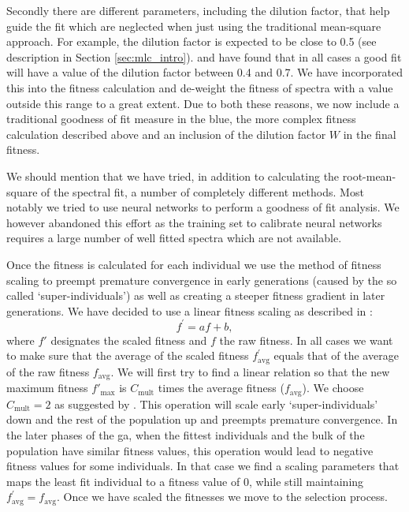 Secondly there are different parameters, including the dilution factor, that help guide the fit which are neglected when just using the traditional mean-square approach. For example, the dilution factor is expected to be close to 0.5 (see description in Section \ref{sec:mlc_intro}). \citet{hachinger_dipl2007} and \citet{hachinger_phd2011} have found that in all cases a good fit will have a value of the dilution factor between 0.4 and 0.7. We have incorporated this into the fitness calculation and de-weight the fitness of spectra with a value outside this range to a great extent. Due to both these reasons, we now include a traditional goodness of fit measure in the blue, the more complex fitness calculation described above and an inclusion of the dilution factor $W$ in the final fitness.

We should mention that we have tried, in addition to calculating the root-mean-square of the spectral fit, a number of completely different methods. Most notably we tried to use neural networks to perform a goodness of fit analysis. We however abandoned this effort as the training set to calibrate neural networks requires a large number of well fitted spectra which are not available. 

Once the fitness is calculated for each individual we use the method of fitness scaling to preempt premature convergence in early generations (caused by the so called `super-individuals') as well as creating a steeper fitness gradient in later generations. We have decided to use a linear fitness scaling as described in \citet[see page 76 of]{citeulike:125978}:
\[
f^\prime = af+b,
\]
where $f\prime$ designates the scaled fitness and $f$ the raw fitness.
In all cases we want to make sure that the average of the scaled fitness $f_\textrm{avg}^\prime$ equals that of the average of the raw fitness $f_\textrm{avg}$. We will first try to find a linear relation so that the new maximum fitness $f'_\textrm{max}$ is $C_\textrm{mult}$ times the average fitness ($f_\textrm{avg}$). We choose $C_\textrm{mult}=2$ as suggested by \citet{citeulike:125978}. This operation will scale early `super-individuals' down and the rest of the population up and preempts premature convergence. In the later phases of the \gls{ga}, when the fittest individuals and the bulk of the population have similar fitness values, this operation would lead to negative fitness values for some individuals. In that case we find a scaling parameters that maps the least fit individual to a fitness value of 0, while still maintaining $f_\textrm{avg}^\prime=f_\textrm{avg}$. Once we have scaled the fitnesses we move to the selection process.

